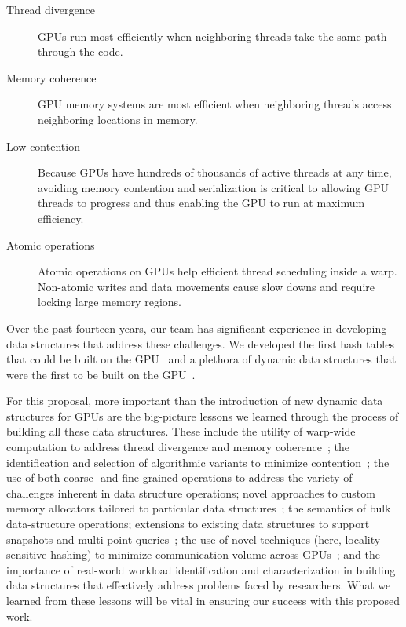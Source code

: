\begin{description}%
  \item[Thread divergence] GPUs run most efficiently when neighboring threads take the same path through the code.
  \item[Memory coherence] GPU memory systems are most efficient when neighboring threads access neighboring locations in memory.
  \item[Low contention] Because GPUs have hundreds of thousands of active threads at any time, avoiding memory contention and serialization is critical to allowing GPU threads to progress and thus enabling the GPU to run at maximum efficiency.
  \item [Atomic operations] Atomic operations on GPUs help efficient thread scheduling inside a warp. Non-atomic writes and data movements cause slow downs and require locking large memory regions.
\end{description}


Over the past fourteen years, our team has significant experience in developing data structures that address these challenges. We developed the first hash tables that could be built on the GPU~\cite{Alcantara:2009:RPH,Alcantara:2011:BAE} and a plethora of dynamic data structures that were the first to be built on the GPU~\cite{Ashkiani:2018:ADH,Ashkiani:2018:GLA,Awad:2019:EAH,GeilFO18,mccoy2022high,nisa2021distributed}.

For this proposal, more important than the introduction of new dynamic data structures for GPUs are the big-picture lessons we learned through the process of building all these data structures. These include the utility of warp-wide computation to address thread divergence and memory coherence~\cite{Ashkiani:2017:PAA}; the identification and selection of algorithmic variants to minimize contention~\cite{Awad:2019:EAH}; the use of both coarse- and fine-grained operations to address the variety of challenges inherent in data structure operations; novel approaches to custom memory allocators tailored to particular data structures~\cite{Ashkiani:2018:ADH}; the semantics of bulk data-structure operations; extensions to existing data structures to support snapshots and multi-point queries~\cite{Awad:2022:AGM,mccoy2022high}; the use of novel techniques (here, locality-sensitive hashing) to minimize communication volume across GPUs~\cite{nisa2021distributed}; and the importance of real-world workload identification and characterization in building data structures that effectively address problems faced by researchers. What we learned from these lessons will be vital in ensuring our success with this proposed work.

